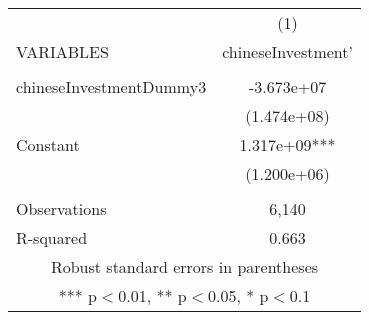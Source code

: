 \documentclass[]{article}
\begin{document}
\begin{tabular}{lc} \hline
 & (1) \\
VARIABLES & chineseInvestment' \\ \hline
 &  \\
chineseInvestmentDummy3 & -3.673e+07 \\
 & (1.474e+08) \\
Constant & 1.317e+09*** \\
 & (1.200e+06) \\
 &  \\
Observations & 6,140 \\
 R-squared & 0.663 \\ \hline
\multicolumn{2}{c}{ Robust standard errors in parentheses} \\
\multicolumn{2}{c}{ *** p$<$0.01, ** p$<$0.05, * p$<$0.1} \\
\end{tabular}
\end{document}
